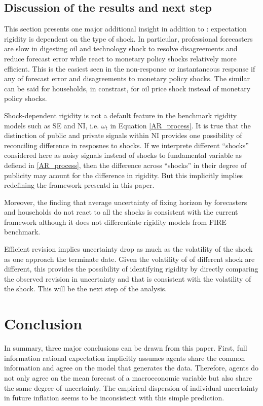 \documentclass[]{article}
\begin{document}
\subsection{Discussion of the results and next step}

This section presents one major additional insight in addition to \cite{coibion2012can}: expectation rigidity is dependent on the type of shock. In particular, professional forecasters are slow in digesting oil and technology shock to resolve disagreements and reduce forecast error while react to monetary policy shocks relatively more efficient. This is the easiest seen in the non-response or instantaneous response if any of forecast error and disagreements to monetary policy shocks. The similar can be said for households, in constrast, for oil price shock instead of monetary policy shocks.

Shock-dependent rigidity is not a default feature in the benchmark rigidity models such as SE and NI, i.e. $\omega_t$ in Equation \ref{AR_process}. It is true that the distinction of public and private signals within NI provides one possibility of reconciling difference in resposnes to shocks.  If we interprete different ``shocks'' considered here as noisy signals instead of shocks to fundamental variable as defiend in \ref{AR_process}, then the difference across ``shocks'' in their degree of publicity may acount for the difference in rigidity.  But this implicitly implies redefining the  framework presentd in this paper. 

Moreover, the finding that average uncertainty of fixing horizon by forecasters and households do not react to all the shocks is consistent with the current framework although it does not differentiate rigidity models from FIRE benchmark.  

Efficient revision implies  uncertainty drop as much as the volatility of the shock as one approach the terminate date. Given the volatility of of different shock are different, this provides the possibility of identifying rigidity by directly comparing the observed revision in uncertainty and that is consistent with the volatility of the shock. This will be the next step of the analysis.  

\section{Conclusion}

In summary, three major conclusions can be drawn from this paper.  First, full information rational expectation implicitly assumes agents share the common information and agree on the model that generates the data. Therefore, agents do not only agree on the mean forecast of a macroeconomic variable but also share the same degree of uncertainty. The empirical dispersion of individual uncertainty in future inflation seems to be inconsistent with this simple prediction. 
 
\end{document}
